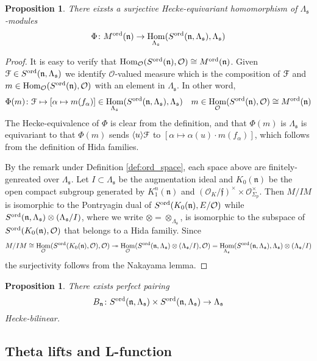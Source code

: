 \documentclass[leqno]{amsart}
\newcommand{\euF}{\EuScript{F}} %
\newcommand{\ord}{\textnormal{ord}}
\newcommand{\oo}{\mathcal{O}} %
\newcommand{\fs}{\mathfrak{s}}
\newcommand{\fn}{\mathfrak{n}}
\newcommand{\ff}{\mathfrak{f}}
\DeclareMathOperator{\Hom}{Hom}
\newtheorem{prop}[thm]{Proposition}
\theoremstyle{definition}
\theoremstyle{remark}
\begin{document}
\begin{prop}
	There eixsts a surjective Hecke-equivariant
	homomorphism of $\Lambda_{\fs}$-modules
	\[
		\Phi\colon M^{\ord}(\fn)\to 
		\Hom_{\Lambda_{\fs}}
		(S^{\ord}(\fn,\Lambda_{\fs}),\Lambda_{\fs})
	\]
\end{prop}
\begin{proof}
It is easy to verify that 
$\Hom_\oo(S^{\ord}(\fn),\oo)\cong M^{\ord}(\fn)$.
Given  $\euF\in S^{\ord}(\fn,\Lambda_{\fs})$
we identify $\oo$-valued measure which is
the composition of $\euF$
and $m\in \Hom_\oo(S^{\ord}(\fn),\oo)$
with an element in $\Lambda_{\fs}$.
In other word, 
\[
	\Phi(m)\colon \euF\mapsto
	[\alpha\mapsto m(f_\alpha)]
	\in \Hom_{\Lambda_{\fs}}
	(S^{\ord}(\fn,\Lambda_{\fs}),\Lambda_{\fs})\quad
	m\in \Hom_\oo(S^{\ord}(\fn),\oo)\cong M^{\ord}(\fn)
\]
The Hecke-equivalence of $\Phi$
is clear from the definition,
and that $\Phi(m)$ is $\Lambda_{\fs}$
is equivariant to that 
$\Phi(m)$ sends $\langle u\rangle \euF$
to $[\alpha\mapsto \alpha(u)\cdot m(f_\alpha)]$,
which follows from the definition of Hida families.

By the remark under Definition \ref{def:ord_space},
each space above are finitely-genreated over
$\Lambda_{\fs}$.
Let $I\subset \Lambda_{\fs}$ be the augmentation ideal
and $K_0(\fn)$ be the open compact subgroup generated
by  $K_1^n(\fn)$ and  
$(\oo_K/\ff)^\times\times \oo_{\Sigma_p}^\times$.
Then 
$M/IM$ is isomorphic to the Pontryagin dual
of  $S^{\ord}(K_0(\fn),E/\oo)$
while $S^{\ord}(\fn,\Lambda_{\fs})\otimes (\Lambda_{\fs}/I)$,
where we write $\otimes=\otimes_{\Lambda_{\fs}}$,
is isomorphic to the subspace of 
$S^{\ord}(K_0(\fn),\oo)$ that belongs to a Hida familiy.
Since 
\[
	M/IM\cong \Hom_{\oo}(S^{\ord}(K_0(\fn),\oo),\oo)
	\twoheadrightarrow
	\Hom_{\oo}(S^{\ord}(\fn,\Lambda_{\fs})
	\otimes(\Lambda_{\fs}/I),\oo)
	= \Hom_{\Lambda_{\fs}} 
	(S^{\ord}(\fn,\Lambda_{\fs}),\Lambda_{\fs})
	\otimes(\Lambda_{\fs}/I)
\]
the surjectivity follows from the Nakayama lemma.

	
\end{proof}

\begin{prop}
	There exists perfect pairing
	\[
		B_\fn\colon 
		S^{\ord}(\fn,\Lambda_{\fs})\times
		S^{\ord}(\fn,\Lambda_{\fs})\to \Lambda_{\fs}
	\]
	Hecke-bilinear. 
\end{prop}

\subsection{Theta lifts and L-function}
\end{document}
